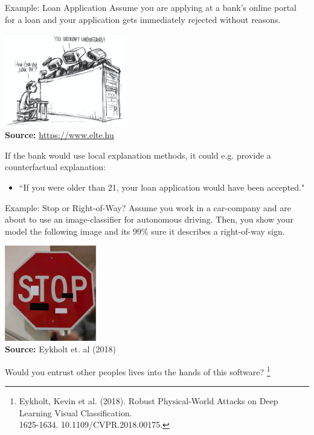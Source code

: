 \documentclass[11pt,compress,t,notes=noshow, xcolor=table]{beamer}
\begin{document}
\begin{vbframe}{Example: Loan Application}
Assume you are applying at a bank's online portal for a loan and your application gets immediately rejected without reasons.
	\begin{center}
		\includegraphics[width=0.4\textwidth]{figure/IntroJudge.png}\\
		{\tiny \textbf{Source:} \href{https://www.elte.hu/content/trendfordulo-az-mi-fejlesztesekben.t.19025}{https://www.elte.hu}}
	\end{center}
	If the bank would use local explanation methods, it could e.g. provide a counterfactual explanation:
	\begin{itemize}
	    \item[] ``If you were older than 21, your loan application would have been accepted."
	\end{itemize}
\end{vbframe}

\begin{vbframe}{Example: Stop or Right-of-Way?}
Assume you work in a car-company and are about to use an image-classifier for autonomous driving. Then, you show your model the following image and its $99\%$ sure it describes a right-of-way sign.
	\begin{center}
		\includegraphics[width=0.3\textwidth]{figure/IntroStop.jpg}\\
		{\tiny \textbf{Source:} Eykholt et. al (2018)}
	\end{center}
	Would you entrust other peoples lives into the hands of this software?
	\footnote[frame]{Eykholt, Kevin et al. (2018). Robust Physical-World Attacks on Deep Learning Visual Classification. \\1625-1634. 10.1109/CVPR.2018.00175.}
\end{vbframe}
\end{document}
